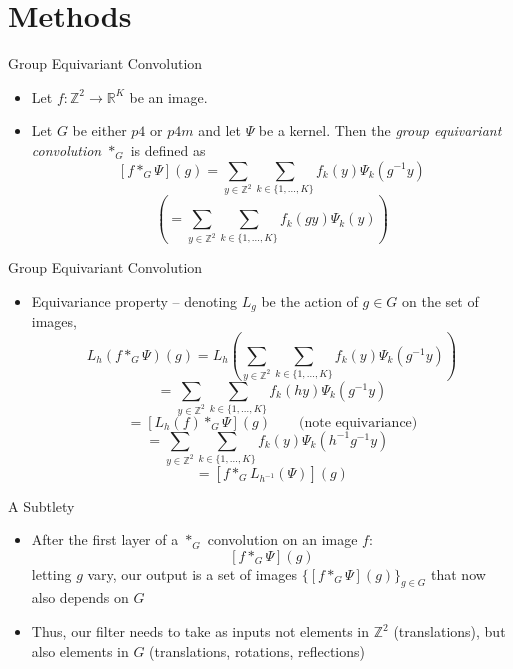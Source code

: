 \documentclass{beamer}
\newcommand{\R}{\mathbb{R}}
\newcommand{\Z}{\mathbb{Z}}
\begin{document}
\section{Methods}

\begin{frame}{Group Equivariant Convolution}
    \begin{itemize}
        \item Let $f: \Z^2 \to \R^K$ be an image.  
        \item Let $G$ be either $p4$ or $p4m$ and let $\Psi$ be a kernel.  Then the \emph{group equivariant convolution} $*_G$ is defined as 
        $$[f *_G \Psi](g) = \sum_{y \in \Z^2}\sum_{k \in \{1, \dots, K\}} f_k(y)\Psi_k(g^{-1}y)$$
        $$\left(= \sum_{y \in \Z^2}\sum_{k \in \{1, \dots, K\}} f_k(gy)\Psi_k(y)\right)$$
    \end{itemize}
\end{frame}

\begin{frame}{Group Equivariant Convolution}
    \begin{itemize}
        \item Equivariance property -- denoting $L_g$ be the action of $g\in G$ on the set of images, 
        $$L_h(f *_G \Psi)(g) = L_h\left(\sum_{y \in \Z^2}\sum_{k \in \{1, \dots, K\}} f_k(y)\Psi_k(g^{-1}y)\right)$$
        $$= \sum_{y \in \Z^2}\sum_{k \in \{1, \dots, K\}} f_k(hy)\Psi_k(g^{-1}y)$$
        $$ = [L_h(f) *_G \Psi](g) \qquad \text{(note equivariance)}$$
        $$= \sum_{y \in \Z^2}\sum_{k \in \{1, \dots, K\}} f_k(y)\Psi_k(h^{-1}g^{-1}y) \text{ }$$
        $$= [f *_G L_{h^{-1}}(\Psi)](g)$$
    \end{itemize}
\end{frame}

\begin{frame}{A Subtlety}
    \begin{itemize}
        \item After the first layer of a $*_G$ convolution on an image $f$:
         $$[f *_G \Psi](g) $$
         letting $g$ vary, our output is a set of images $\{[f *_G \Psi](g)\}_{g\in G}$ that now also depends on $G$
         \item Thus, our filter needs to take as inputs not elements in $\Z^2$ (translations), but also elements in $G$ (translations, rotations, reflections)
    \end{itemize}
\end{frame}
\end{document}
